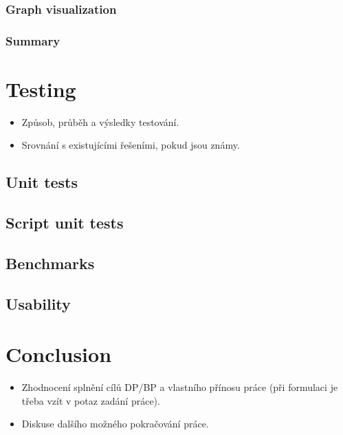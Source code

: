\documentclass[11pt,twoside,a4paper]{book}
\begin{document}
\subsection{Graph visualization}

\subsection{Summary}




\chapter{Testing}

\begin{itemize}
 \item Způsob, průběh a výsledky testování.
 \item Srovnání s existujícími řešeními, pokud jsou známy.
\end{itemize}

\section{Unit tests}

\section{Script unit tests}

\section{Benchmarks}

\section{Usability}



\chapter{Conclusion}

\begin{itemize}
\item Zhodnocení splnění cílů DP/BP a  vlastního přínosu práce (při formulaci je třeba vzít v potaz zadání práce).
\item Diskuse dalšího možného pokračování práce.
\end{itemize}
\end{document}
